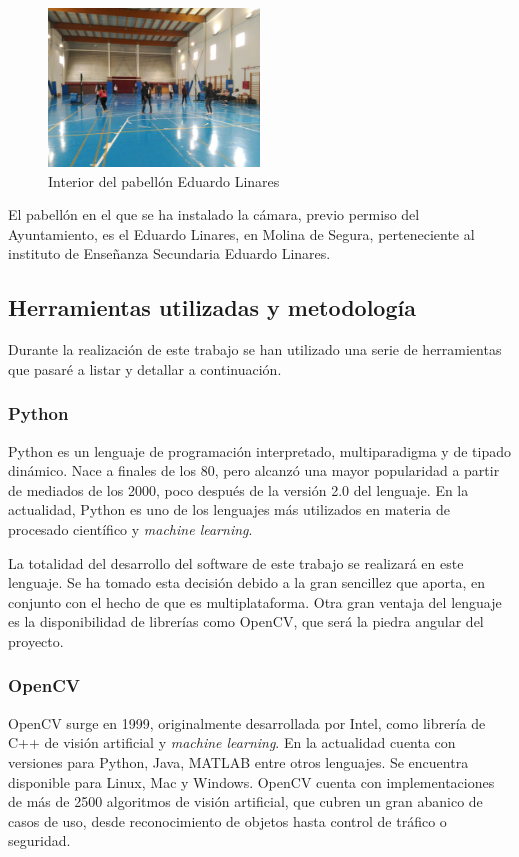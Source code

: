 \begin{figure}
    \centering
    \includegraphics[width=0.5\textwidth]{images/EduardoLinaresDentro}
    \caption{Interior del pabellón Eduardo Linares}
    \label{fig:pabellonDentro}
\end{figure}

El pabellón en el que se ha instalado la cámara, previo permiso del Ayuntamiento, es el Eduardo Linares, en Molina de Segura, perteneciente al instituto de Enseñanza Secundaria Eduardo Linares.

\subsection{Herramientas utilizadas y metodología}
Durante la realización de este trabajo se han utilizado una serie de herramientas que pasaré a listar y detallar a continuación.

\subsubsection*{Python}
Python es un lenguaje de programación interpretado, multiparadigma y de tipado dinámico. Nace a finales de los 80, pero alcanzó una mayor popularidad a partir de mediados de los 2000, poco después de la versión 2.0 del lenguaje. En la actualidad, Python es uno de los lenguajes más utilizados en materia de procesado científico y \textit{machine learning}.

La totalidad del desarrollo del software de este trabajo se realizará en este lenguaje. Se ha tomado esta decisión debido a la gran sencillez que aporta, en conjunto con el hecho de que es multiplataforma. Otra gran ventaja del lenguaje es la disponibilidad de librerías como OpenCV, que será la piedra angular del proyecto. 

\subsubsection*{OpenCV}
OpenCV surge en 1999, originalmente desarrollada por Intel, como librería de C++ de visión artificial y \textit{machine learning}. En la actualidad cuenta con versiones para Python, Java, MATLAB entre otros lenguajes. Se encuentra disponible para Linux, Mac y Windows. OpenCV cuenta con implementaciones de más de 2500 algoritmos de visión artificial, que cubren un gran abanico de casos de uso, desde reconocimiento de objetos hasta control de tráfico o seguridad.

